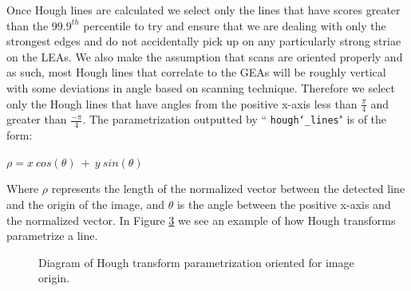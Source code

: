 \documentclass[12pt]{article}
\theoremstyle{nonumberplain}
\begin{document}
Once Hough lines are calculated we select only the lines that have scores greater than the $99.9^{th}$ percentile to try and ensure that we are dealing with only the strongest edges and do not accidentally pick up on any particularly strong striae on the LEAs. We also make the assumption that scans are oriented properly and as such, most Hough lines that correlate to the GEAs will be roughly vertical with some deviations in angle based on scanning technique. Therefore we select only the Hough lines that have angles from the positive x-axis less than $\frac{\pi}{4}$ and greater than $\frac{-\pi}{4}$. The parametrization outputted by `` \texttt{hough\char`_lines}" is of the form:

\begin{center}
$\rho = x \ cos(\theta) \ + \ y \ sin(\theta)$
\end{center}

Where $\rho$ represents the length of the normalized vector between the detected line and the origin of the image, and $\theta$ is the angle between the positive x-axis and the normalized vector. In Figure \ref{fig: parametrization} we see an example of how Hough transforms parametrize a line.

\begin{figure}[!ht]
  \begin{subfigure}{.5\textwidth}
    \centering
  \label{fig: tikz1}
  \end{subfigure}
  \begin{subfigure}{.5\textwidth}
    \centering
    \label{fig: tikz2}
  \end{subfigure}
  \caption{Diagram of Hough transform parametrization oriented for image origin.}
  \label{fig: parametrization}
\end{figure}
\end{document}

